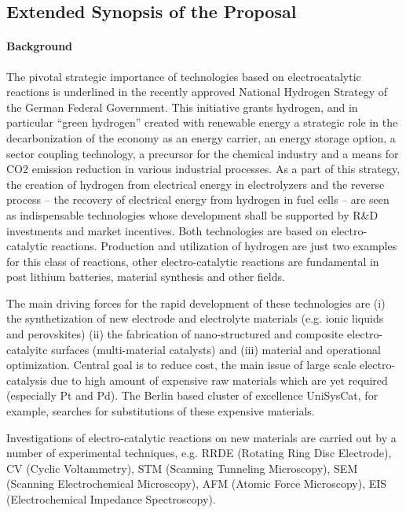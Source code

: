 \documentclass[a4paper,10pt]{article}
\begin{document}
\insertProjectHeader


\subsection*{Extended Synopsis of the Proposal}

\paragraph{Background}



The pivotal strategic importance of technologies based on electrocatalytic reactions is underlined in the recently approved National Hydrogen Strategy of the German Federal Government.  This initiative grants hydrogen, and in particular ``green hydrogen'' created with renewable energy a strategic role in the decarbonization of the economy as an energy carrier, an energy storage option, a sector coupling technology, a precursor for the chemical industry and a means for CO2 emission reduction in various industrial processes.
As a part of this strategy, the creation of hydrogen from electrical energy in electrolyzers and the reverse process -- the recovery of electrical energy from hydrogen in fuel cells -- are seen as indispensable technologies whose development shall be supported by R\&D investments and market incentives.
%
Both technologies are based on electro-catalytic reactions. Production and utilization of hydrogen are just two examples for this class of reactions, other electro-catalytic reactions are fundamental in post lithium batteries, material synthesis and other fields.

The main driving forces for the rapid development of these technologies are (i) the synthetization of new electrode and electrolyte materials (e.g. ionic liquids and perovskites) (ii) the fabrication of nano-structured and composite electro-catalyitc surfaces (multi-material catalysts) and (iii) material and operational optimization. Central goal is to reduce cost, the main issue of large scale electro-catalysis due to high amount of expensive raw materials which are yet required (especially Pt and Pd). The Berlin based cluster of excellence UniSysCat, for example, searches for substitutions of these expensive materials.

Investigations of electro-catalytic reactions on new materials  
are carried out by a number of  experimental techniques,  e.g.
RRDE    (Rotating   Ring    Disc   Electrode),   
CV  (Cyclic  Voltammetry),  
STM (Scanning Tunneling Microscopy), 
SEM (Scanning  Electrochemical Microscopy),
AFM (Atomic Force Microscopy), 
EIS (Electrochemical Impedance Spectroscopy).
\end{document}
